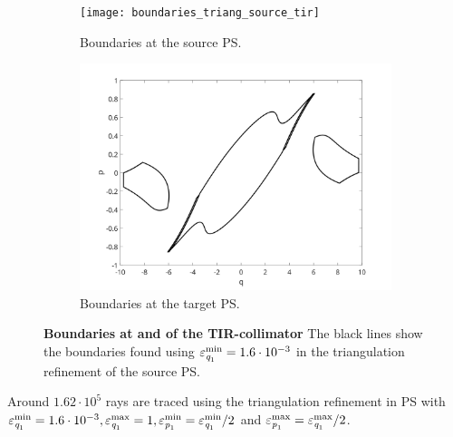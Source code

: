 \begin{figure}[h]
 \begin{subfigure}[]{0.47\textwidth}
\centering
    \texttt{[image: boundaries\_triang\_source\_tir]}
    \caption{Boundaries at the source PS.}
    \label{fig:boundaries_triang_source_tir}
\end{subfigure}
\hfill
\begin{subfigure}[t]{0.47\textwidth}
\centering
    \includegraphics[width = \textwidth]{boundaries_triang_target_tir}
    \caption{Boundaries at the target PS.}
    \label{fig:boundaries_triang_target_tir}
\end{subfigure}
\caption{\textbf{Boundaries at  and  of the TIR-collimator} The black lines show the boundaries found using $\varepsilon_{\textit{q}_1}^{\textrm{min}}=1.6\cdot 10^{-3}$ in the triangulation refinement of the source PS.}
 \label{fig:boundaries_TIR_triangulation}
\end{figure}
Around $1.62 \cdot 10^5$ rays are traced using the triangulation refinement in PS with $\varepsilon_{\textit{q}_1}^{\textrm{min}}=1.6\cdot 10^{-3}, \varepsilon_{\textit{q}_1}^{\textrm{max}}=1, \varepsilon_{\textit{p}_1}^{\textrm{min}}=\varepsilon_{\textit{q}_1}^{\textrm{min}}/2$ and $\varepsilon_{\textit{p}_1}^{\textrm{max}} = \varepsilon_{\textit{q}_1}^{\textrm{max}}/2$. \\ \indent 
